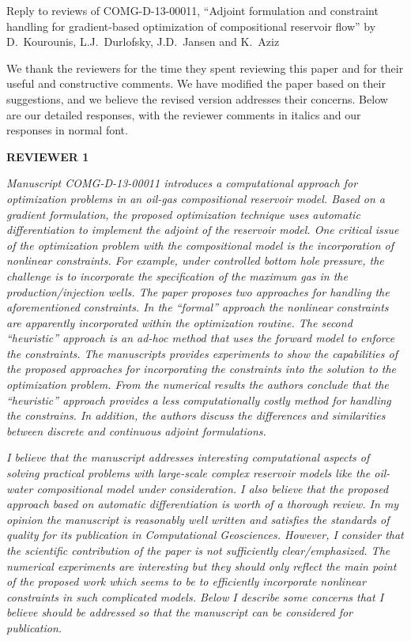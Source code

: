 \documentclass{article}
\begin{document}
Reply to reviews of COMG-D-13-00011, ``Adjoint formulation and constraint handling for gradient-based optimization of compositional reservoir flow'' by D.~Kourounis, L.J.~Durlofsky, J.D.~Jansen and K.~Aziz

\vspace{10pt}

We thank the reviewers for the time they spent reviewing this paper and for their useful and constructive comments. We have modified the paper based on their suggestions, and we believe the revised version addresses their concerns. Below are our detailed responses, with the reviewer comments in italics and our responses in normal font.

\vspace{10pt}

{\bf REVIEWER 1}

{\it Manuscript COMG-D-13-00011 introduces a computational approach for optimization problems in an oil-gas compositional reservoir model. Based on a gradient formulation, the proposed optimization technique uses automatic differentiation to implement the adjoint of the reservoir model. One critical issue of the optimization problem with the compositional model is the incorporation of nonlinear constraints. For example, under controlled bottom hole pressure, the challenge is to incorporate the specification of the maximum gas in the production/injection wells. The paper proposes two approaches for handling the aforementioned constraints. In the ``formal'' approach the nonlinear constraints are apparently incorporated within the optimization routine. The second ``heuristic'' approach is an ad-hoc method that uses the forward model to enforce the constraints. The manuscripts provides experiments to show the capabilities of the proposed approaches for incorporating the constraints into the solution to the optimization problem. From the numerical results the authors conclude that the ``heuristic'' approach provides a less computationally costly method for handling the constrains. In addition, the authors discuss the differences and similarities between discrete and continuous adjoint formulations.}


{\it I believe that the manuscript addresses interesting computational aspects of
solving practical problems with large-scale complex reservoir models like the
oil-water compositional model under consideration. I also believe that the
proposed approach based on automatic differentiation is worth of a thorough
review. In my opinion the manuscript is reasonably well written and satisfies the
standards of quality for its publication in Computational Geosciences. However,
I consider that the scientific contribution of the paper is not
sufficiently clear/emphasized. The numerical experiments are interesting but they should only reflect the main point of the proposed work which seems to be to efficiently incorporate
nonlinear constraints in such complicated models. Below I describe some concerns
that I believe should be addressed so that the manuscript can be considered for
publication.} 
\end{document}
